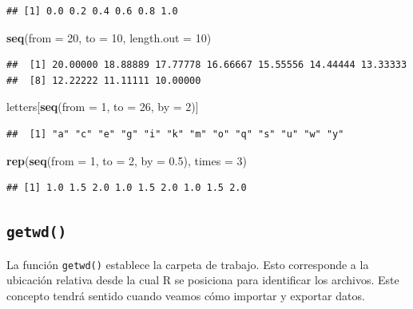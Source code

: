 \documentclass[]{book}
\newenvironment{Shaded}{\begin{snugshade}}{\end{snugshade}}
\newcommand{\KeywordTok}[1]{\textcolor[rgb]{0.13,0.29,0.53}{\textbf{#1}}}
\newcommand{\DataTypeTok}[1]{\textcolor[rgb]{0.13,0.29,0.53}{#1}}
\newcommand{\DecValTok}[1]{\textcolor[rgb]{0.00,0.00,0.81}{#1}}
\newcommand{\FloatTok}[1]{\textcolor[rgb]{0.00,0.00,0.81}{#1}}
\newcommand{\NormalTok}[1]{#1}
\begin{document}
\begin{verbatim}
## [1] 0.0 0.2 0.4 0.6 0.8 1.0
\end{verbatim}

\begin{Shaded}
\begin{Highlighting}[]
\KeywordTok{seq}\NormalTok{(}\DataTypeTok{from =} \DecValTok{20}\NormalTok{, }\DataTypeTok{to =} \DecValTok{10}\NormalTok{, }\DataTypeTok{length.out =} \DecValTok{10}\NormalTok{)}
\end{Highlighting}
\end{Shaded}

\begin{verbatim}
##  [1] 20.00000 18.88889 17.77778 16.66667 15.55556 14.44444 13.33333
##  [8] 12.22222 11.11111 10.00000
\end{verbatim}

\begin{Shaded}
\begin{Highlighting}[]
\NormalTok{letters[}\KeywordTok{seq}\NormalTok{(}\DataTypeTok{from =} \DecValTok{1}\NormalTok{, }\DataTypeTok{to =} \DecValTok{26}\NormalTok{, }\DataTypeTok{by =} \DecValTok{2}\NormalTok{)]}
\end{Highlighting}
\end{Shaded}

\begin{verbatim}
##  [1] "a" "c" "e" "g" "i" "k" "m" "o" "q" "s" "u" "w" "y"
\end{verbatim}

\begin{Shaded}
\begin{Highlighting}[]
\KeywordTok{rep}\NormalTok{(}\KeywordTok{seq}\NormalTok{(}\DataTypeTok{from =} \DecValTok{1}\NormalTok{, }\DataTypeTok{to =} \DecValTok{2}\NormalTok{, }\DataTypeTok{by =} \FloatTok{0.5}\NormalTok{), }\DataTypeTok{times =} \DecValTok{3}\NormalTok{)}
\end{Highlighting}
\end{Shaded}

\begin{verbatim}
## [1] 1.0 1.5 2.0 1.0 1.5 2.0 1.0 1.5 2.0
\end{verbatim}

\subsection{\texorpdfstring{\texttt{getwd()}}{getwd()}}\label{l015getwd}

La función \texttt{getwd()} establece la carpeta de trabajo. Esto
corresponde a la ubicación relativa desde la cual R se posiciona para
identificar los archivos. Este concepto tendrá sentido cuando veamos
cómo importar y exportar datos.
\end{document}
